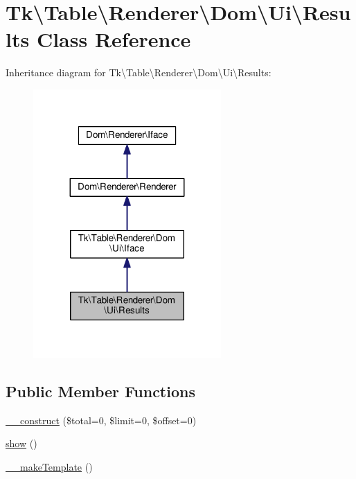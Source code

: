 \hypertarget{classTk_1_1Table_1_1Renderer_1_1Dom_1_1Ui_1_1Results}{\section{Tk\textbackslash{}Table\textbackslash{}Renderer\textbackslash{}Dom\textbackslash{}Ui\textbackslash{}Results Class Reference}
\label{classTk_1_1Table_1_1Renderer_1_1Dom_1_1Ui_1_1Results}
}


Inheritance diagram for Tk\textbackslash{}Table\textbackslash{}Renderer\textbackslash{}Dom\textbackslash{}Ui\textbackslash{}Results\+:\nopagebreak
\begin{figure}[H]
\begin{center}
\leavevmode
\includegraphics[width=203pt]{classTk_1_1Table_1_1Renderer_1_1Dom_1_1Ui_1_1Results__inherit__graph}
\end{center}
\end{figure}
\subsection*{Public Member Functions}
\begin{DoxyCompactItemize}
\item 
\hyperlink{classTk_1_1Table_1_1Renderer_1_1Dom_1_1Ui_1_1Results_ac77765aeacade9dcd6f2edbf2043d029}{\+\_\+\+\_\+construct} (\$total=0, \$limit=0, \$offset=0)
\item 
\hyperlink{classTk_1_1Table_1_1Renderer_1_1Dom_1_1Ui_1_1Results_a6cb4921fdb6a62b96a35d80c780df122}{show} ()
\item 
\hyperlink{classTk_1_1Table_1_1Renderer_1_1Dom_1_1Ui_1_1Results_af022a42a0644cd4b2128e5c29446edbe}{\+\_\+\+\_\+make\+Template} ()
\end{DoxyCompactItemize}

